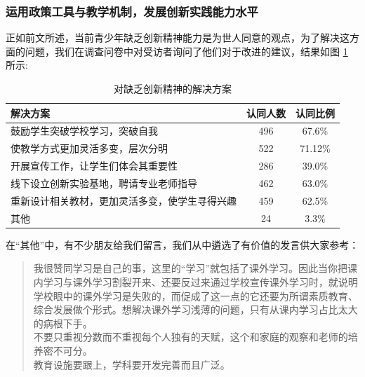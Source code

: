 \documentclass[12pt,UTF8]{ctexart}
\begin{document}
\subsubsection {运用政策工具与教学机制，发展创新实践能力水平}
\par {
	正如前文所述，当前青少年缺乏创新精神能力是为世人同意的观点，为了解决这方面的问题，我们在调查问卷中对受访者询问了他们对于改进的建议，结果如图
	\ref{fig:14} 所示:
	\begin{table}[htbp]
		\centering
		\caption{对缺乏创新精神的解决方案}
		\label{fig:14}
		\begin{tabular}{lcc}
			\hline
			\hline
			{\bf 解决方案} & {\bf 认同人数} & {\bf 认同比例}\\ \hline
			鼓励学生突破学校学习，突破自我 & 496 & 67.6\% \\
			使教学方式更加灵活多变，层次分明 & 522 & 71.12\% \\
			开展宣传工作，让学生们体会其重要性 & 286 & 39.0\% \\
			线下设立创新实验基地，聘请专业老师指导 & 462 & 63.0\% \\
			重新设计相关教材，更加灵活多变，使学生寻得兴趣 & 459 & 62.5\% \\
			其他 & 24 & 3.3\% \\
			\hline
			\hline
		\end{tabular}
	\end{table}
	在“其他”中，有不少朋友给我们留言，我们从中遴选了有价值的发言供大家参考：
	\begin{quote}
		\kaishu
		我很赞同学习是自己的事，这里的“学习”就包括了课外学习。因此当你把课内学习与课外学习割裂开来、还要反过来通过学校宣传课外学习时，就说明学校眼中的课外学习是失败的，而促成了这一点的它还要为所谓素质教育、综合发展做个形式。想解决课外学习浅薄的问题，只有从课内学习占比太大的病根下手。\\
		不要只重视分数而不重视每个人独有的天赋，这个和家庭的观察和老师的培养密不可分。\\
		教育设施要跟上，学科要开发完善而且广泛。\\
	\end{quote}
}
\end{document}
